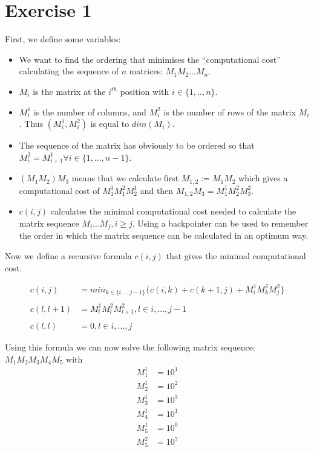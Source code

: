 \section*{Exercise 1} %
\label{sec:Exercise 1}

First, we define some variables: 

\begin{itemize}
	\item We want to find the ordering that minimises the 
	``computational cost'' calculating the sequence of $n$ matrices: $M_{1}M_{2}...M_{n}$.
	\item $M_i$ is the matrix at the $i^{th}$ position with $i \in \{1,..,n\}$.
	\item $M_i^1$ is the number of columns, and $M_i^2$ is the number of rows of the matrix $M_i$. Thus $(M_i^1,M_i^2)$ is equal to $dim(M_i)$.
	\item The sequence of the matrix has obviously to be ordered so that $M_i^2 = M_{i+1}^1 \forall i \in \{1,...,n-1\}$.
	\item $(M_{1}M_{2})M_{3}$ means that we calculate first $M_{1,2} := M_{1}M_{2}$ which gives a computational cost of $M_1^{1}M_1^{2}M_2^{1}$ 
		  and then $M_{1,2}M_{3} = M_1^{1}M_2^{2}M_3^{2}$.
    \item $c(i,j)$ calculates the minimal computational cost needed to calculate the matrix sequence $M_{i}...M_{j}, i \geq j$. Using a backpointer 
		  can be used to remember the order in which the matrix sequence can be calculated in an optimum way.
\end{itemize}

Now we define a recursive formula $c(i,j)$ that gives the minimal computational cost.

\begin{align*}
	c(i,j) &= min_{k \in \{i,..,j-1\}}\{c(i,k) + c(k+1,j) + M_i^{1}M_k^{2}M_j^{2}\} \\
	& \\
	c(l,l+1) &= M_l^{1}M_l^{2}M_{l+1}^{2}, l \in {i,...,j-1} \\
	& \\
	c(l,l) &= 0, l \in {i,...,j}
\end{align*}

Using this formula we can now solve the following matrix sequence: 
$M_{1}M_{2}M_{3}M_{4}M_{5}$ with 
\begin{align*}
	M_1^{1} &= {10}^1   \\
	M_2^{1} &= {10}^2   \\
	M_3^{1} &= {10}^3   \\
	M_4^{1} &= {10}^1   \\
	M_5^{1} &= {10}^0   \\
	M_5^{2} &= {10}^7   \\
\end{align*}


